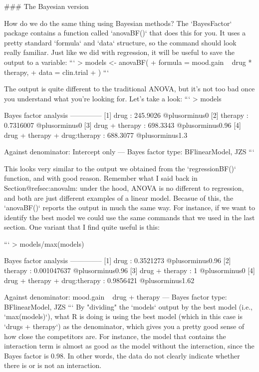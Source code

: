 ### The Bayesian version

How do we do the same thing using Bayesian methods? The `BayesFactor` package contains a function called `anovaBF()` that does this for you. It uses a pretty standard `formula` and `data` structure, so the command should look really familiar. Just like we did with regression, it will be useful to save the output to a variable:
```
> models <- anovaBF( 
+   formula = mood.gain ~ drug * therapy,
+   data = clin.trial
+ )
```


The output is quite different to the traditional ANOVA, but it's not too bad once you understand what you're looking for. Let's take a look:
```
> models

Bayes factor analysis
--------------
[1] drug                          : 245.9026  @plusorminus0%
[2] therapy                       : 0.7316007 @plusorminus0%
[3] drug + therapy                : 698.3343  @plusorminus0.96%
[4] drug + therapy + drug:therapy : 688.3077  @plusorminus1.3%

Against denominator:
  Intercept only 
---
Bayes factor type: BFlinearModel, JZS
```


This looks very similar to the output we obtained from the `regressionBF()` function, and with good reason. Remember what I said back in Section@refsec:anovalm: under the hood, ANOVA is no different to regression, and both are just different examples of a linear model. Becasue of this, the  `anovaBF()` reports the output in much the same way. For instance, if we want to identify the best model we could use the same commands that we used in the last section. One variant that I find quite useful is this:

```
> models/max(models)

Bayes factor analysis
--------------
[1] drug                          : 0.3521273   @plusorminus0.96%
[2] therapy                       : 0.001047637 @plusorminus0.96%
[3] drug + therapy                : 1           @plusorminus0%
[4] drug + therapy + drug:therapy : 0.9856421   @plusorminus1.62%

Against denominator:
  mood.gain ~ drug + therapy 
---
Bayes factor type: BFlinearModel, JZS
```
By "dividing" the `models` output by the best model (i.e., `max(models)`), what R is doing is using the best model (which in this case is `drugs + therapy`) as the denominator, which gives you a pretty good sense of how close the competitors are. For instance, the model that contains the interaction term is almost as good as the model without the interaction, since the Bayes factor is 0.98. In other words, the data do not clearly indicate whether there is or is not an interaction.  

